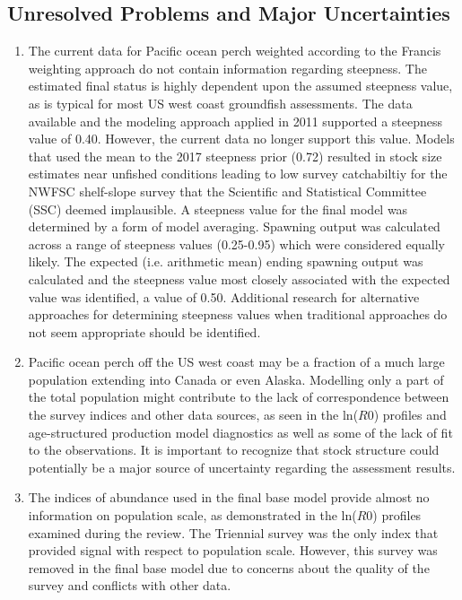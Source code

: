 \documentclass[12pt,]{article}
\begin{document}
\FloatBarrier

\subsection*{Unresolved Problems and Major
Uncertainties}\label{unresolved-problems-and-major-uncertainties}

\begin{enumerate}

\item The current data for Pacific ocean perch weighted according to the Francis weighting approach do not contain information regarding steepness.  The estimated final status is highly dependent upon the assumed steepness value, as is typical for most US west coast groundfish assessments.  The data available and the modeling approach applied in 2011 supported a steepness value of 0.40.  However, the current data no longer support this value.  Models that used the mean to the 2017 steepness prior (0.72) resulted in stock size estimates near unfished conditions leading to low survey catchabiltiy for the NWFSC shelf-slope survey that the Scientific and Statistical Committee (SSC) deemed implausible.  A steepness value for the final model was determined by a form of model averaging. Spawning output was calculated across a range of steepness values (0.25-0.95) which were considered equally likely.  The expected (i.e. arithmetic mean) ending spawning output was calculated and the steepness value most closely associated with the expected value was identified, a value of 0.50.  Additional research for alternative approaches for determining steepness values when traditional approaches do not seem appropriate should be identified.  

\item Pacific ocean perch off the US west coast may be a fraction of a much large population extending into Canada or even Alaska. Modelling only a part of the total population might contribute to the lack of correspondence between the survey indices and other data sources, as seen in the ln($R0$) profiles and age-structured production model diagnostics as well as some of the lack of fit to the observations. It is important to recognize that stock structure could potentially be a major source of uncertainty regarding the assessment results.
  
\item The indices of abundance used in the final base model provide almost no information on population scale, as demonstrated in the ln($R0$) profiles examined during the review. The Triennial survey was the only index that provided signal with respect to population scale. However, this survey was removed in the final base model due to concerns about the quality of the survey and conflicts with other data.


\end{enumerate}
\end{document}
